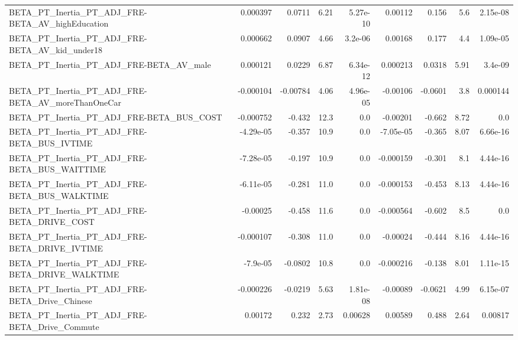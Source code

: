 \begin{tabular}{lrrrrrrrr}
BETA\_PT\_Inertia\_PT\_ADJ\_FRE-BETA\_AV\_highEducation   &    0.000397 &       0.0711 &     6.21 & 5.27e-10 &    0.00112 &       0.156 &          5.6 &      2.15e-08 \\
BETA\_PT\_Inertia\_PT\_ADJ\_FRE-BETA\_AV\_kid\_under18     &    0.000662 &       0.0907 &     4.66 &  3.2e-06 &    0.00168 &       0.177 &          4.4 &      1.09e-05 \\
BETA\_PT\_Inertia\_PT\_ADJ\_FRE-BETA\_AV\_male            &    0.000121 &       0.0229 &     6.87 & 6.34e-12 &   0.000213 &      0.0318 &         5.91 &       3.4e-09 \\
BETA\_PT\_Inertia\_PT\_ADJ\_FRE-BETA\_AV\_moreThanOneCar  &   -0.000104 &     -0.00784 &     4.06 & 4.96e-05 &   -0.00106 &     -0.0601 &          3.8 &      0.000144 \\
BETA\_PT\_Inertia\_PT\_ADJ\_FRE-BETA\_BUS\_COST           &   -0.000752 &       -0.432 &     12.3 &      0.0 &   -0.00201 &      -0.662 &         8.72 &           0.0 \\
BETA\_PT\_Inertia\_PT\_ADJ\_FRE-BETA\_BUS\_IVTIME         &   -4.29e-05 &       -0.357 &     10.9 &      0.0 &  -7.05e-05 &      -0.365 &         8.07 &      6.66e-16 \\
BETA\_PT\_Inertia\_PT\_ADJ\_FRE-BETA\_BUS\_WAITTIME       &   -7.28e-05 &       -0.197 &     10.9 &      0.0 &  -0.000159 &      -0.301 &          8.1 &      4.44e-16 \\
BETA\_PT\_Inertia\_PT\_ADJ\_FRE-BETA\_BUS\_WALKTIME       &   -6.11e-05 &       -0.281 &     11.0 &      0.0 &  -0.000153 &      -0.453 &         8.13 &      4.44e-16 \\
BETA\_PT\_Inertia\_PT\_ADJ\_FRE-BETA\_DRIVE\_COST         &    -0.00025 &       -0.458 &     11.6 &      0.0 &  -0.000564 &      -0.602 &          8.5 &           0.0 \\
BETA\_PT\_Inertia\_PT\_ADJ\_FRE-BETA\_DRIVE\_IVTIME       &   -0.000107 &       -0.308 &     11.0 &      0.0 &   -0.00024 &      -0.444 &         8.16 &      4.44e-16 \\
BETA\_PT\_Inertia\_PT\_ADJ\_FRE-BETA\_DRIVE\_WALKTIME     &    -7.9e-05 &      -0.0802 &     10.8 &      0.0 &  -0.000216 &      -0.138 &         8.01 &      1.11e-15 \\
BETA\_PT\_Inertia\_PT\_ADJ\_FRE-BETA\_Drive\_Chinese      &   -0.000226 &      -0.0219 &     5.63 & 1.81e-08 &   -0.00089 &     -0.0621 &         4.99 &      6.15e-07 \\
BETA\_PT\_Inertia\_PT\_ADJ\_FRE-BETA\_Drive\_Commute      &     0.00172 &        0.232 &     2.73 &  0.00628 &    0.00589 &       0.488 &         2.64 &       0.00817 \\

\end{tabular}
